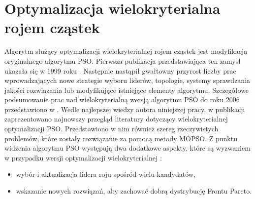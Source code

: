 \section{Optymalizacja wielokryterialna rojem cząstek}
Algorytm służący optymalizacji wielokryterialnej rojem cząstek  jest modyfikacją oryginalnego algorytmu PSO. Pierwsza publikacja przedstawiająca ten zamysł ukazała się w 1999 roku \parencite{Moore1999}. Następnie nastąpił gwałtowny przyrost liczby prac wprowadzających nowe strategie wyboru liderów, topologie, systemy sprawdzania jakości rozwiązania lub modyfikujące istniejące elementy algorytmu. Szczegółowe podsumowanie prac nad wielokryterialną wersją algorytmu PSO do roku 2006 przedstawiono w \parencite{CoelloCoello2006}. Wedle najlepszej wiedzy autora niniejszej pracy, w publikacji \cite{Lalwani2013} zaprezentowano najnowszy przegląd literatury dotyczący wielokryterialnej optymalizacji PSO. Przedstawiono w nim również szereg rzeczywistych problemów, które zostały rozwiązanie za pomocą metody MOPSO.
Z punktu widzenia algorytmu PSO występują dwa dodatkowe aspekty, które są wyzwaniem w przypadku wersji optymalizacji wielokryterialnej \parencite{Pulido2005OnTU}:
\begin{itemize}
	\item wybór i aktualizacja lidera roju spośród wielu kandydatów,
	\item wskazanie nowych rozwiązań, aby zachować dobrą dystrybucję Frontu Pareto.
\end{itemize}
